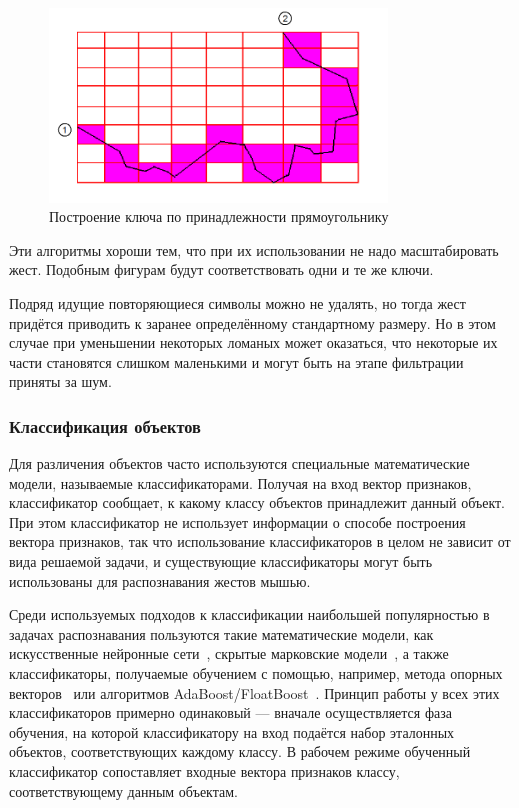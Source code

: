 \documentclass[a5paper]{article}
\begin{document}
\begin{figure} [ht]
  \begin{center}
    \includegraphics[width=0.8\textwidth, bb=0 0 544 390]{03-squares.png}
    \caption{Построение ключа по принадлежности прямоугольнику}
    \label{squares}
  \end{center}
\end{figure}

Эти алгоритмы хороши тем, что при их использовании не надо масштабировать жест. Подобным фигурам будут соответствовать одни и те же ключи.

Подряд идущие повторяющиеся символы можно не удалять, но тогда жест придётся приводить к заранее определённому стандартному размеру. Но в этом случае при уменьшении некоторых ломаных может оказаться, что некоторые их части становятся слишком маленькими и могут быть на этапе фильтрации приняты за шум.

\subsubsection{Классификация объектов}
Для различения объектов часто используются специальные математические модели, называемые классификаторами. Получая на вход вектор признаков, классификатор сообщает, к какому классу объектов принадлежит данный объект. При этом классификатор не использует информации о способе построения вектора признаков, так что использование классификаторов в целом не зависит от вида решаемой задачи, и существующие классификаторы могут быть использованы для распознавания жестов мышью. 

Среди используемых подходов к классификации наибольшей популярностью в задачах распознавания пользуются такие математические модели, как искусственные нейронные сети~\cite{neuronet1, neuronet2, neuronet3}, скрытые марковские модели~\cite{hmm1, hmm2, hmm3}, а также классификаторы, получаемые обучением с помощью, например, метода опорных векторов~\cite{svm1, svm2} или алгоритмов AdaBoost/FloatBoost~\cite{boosting1, boosting2}. Принцип работы у всех этих классификаторов примерно одинаковый --- вначале осуществляется фаза обучения, на которой классификатору на вход подаётся набор эталонных объектов, соответствующих каждому классу. В рабочем режиме обученный классификатор сопоставляет входные вектора признаков классу, соответствующему данным объектам.
\end{document}
